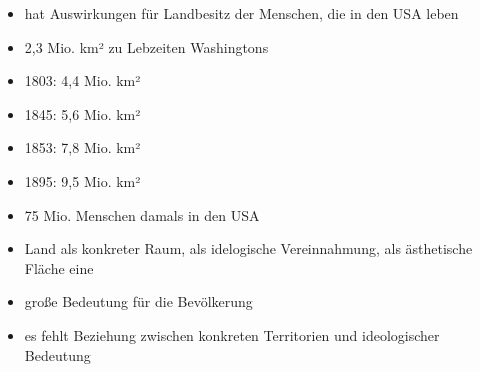 \documentclass[10pt,a4paper,oneside,ngerman,numbers=noenddot]{scrartcl}
\newenvironment{myitemize}{\begin{itemize}\itemsep -8pt}{\end{itemize}} %
\begin{document}
\begin{myitemize}
    \item hat Auswirkungen für Landbesitz der Menschen, die in den USA leben
    \item 2,3 Mio. km² zu Lebzeiten Washingtons
    \item 1803: 4,4 Mio. km²
    \item 1845: 5,6 Mio. km²
    \item 1853: 7,8 Mio. km²
    \item 1895: 9,5 Mio. km²
    \item 75 Mio. Menschen damals in den USA
    \item Land als konkreter Raum, als idelogische Vereinnahmung, als ästhetische Fläche eine
    \item große Bedeutung für die Bevölkerung
    \item es fehlt Beziehung zwischen konkreten Territorien und ideologischer Bedeutung
\end{myitemize}
\end{document}
